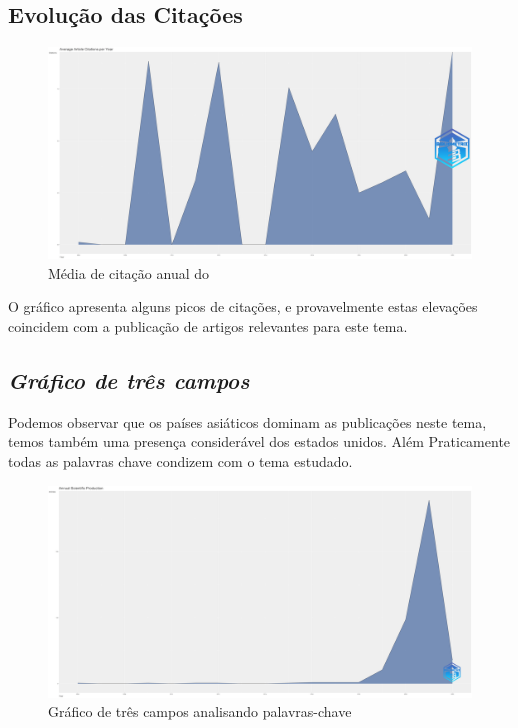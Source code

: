 \subsection{Evolução das Citações}

\begin{figure}[ht]
    \centering
    \includegraphics[width=12cm]{experiments/DanielrCardoso/AnaliseBibliometrica/AverageArticleCitationPerYear-2022-02-10.png}
    \caption{Média de citação anual do \dataset\  }
    \label{fig:citDanielrCardoso}
\end{figure}

O gráfico apresenta alguns picos de citações, e provavelmente estas elevações coincidem com a publicação de artigos relevantes para este tema. 

\subsection{\textit{Gráfico de três campos}}
Podemos observar que os países asiáticos dominam as publicações neste tema, temos também uma presença considerável dos estados unidos. Além Praticamente todas as palavras chave condizem com o tema estudado.

\begin{figure}[ht]
    \centering
    \includegraphics[width=12cm]{experiments/DanielrCardoso/AnaliseBibliometrica/AnnualScientificProduction-2022-02-10.png}
    \caption{Gráfico de três campos analisando palavras-chave}
    \label{fig:thDanielrCardoso}
\end{figure}
